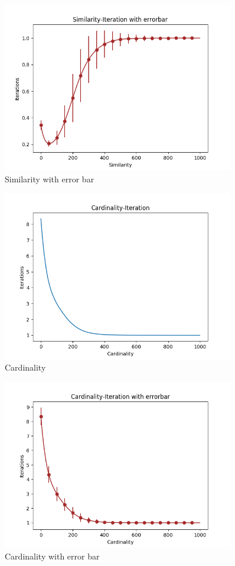 \documentclass[a4paper,12pt]{article}
\begin{document}
    \begin{figure}[H]
    	\centering
    	\includegraphics[width=0.9\textwidth]{SimErr50_4_1000_1500_e2}
    	\caption{Similarity with error bar}\label{SimErr50_4_1000_1500_e2}
    \end{figure}
    \begin{figure}[H]
    	\centering
    	\includegraphics[width=0.9\textwidth]{Card50_4_1000_1500_e2}
    	\caption{Cardinality}\label{Card50_4_1000_1500_e2}
    \end{figure}
    \begin{figure}[H]
    	\centering
    	\includegraphics[width=0.9\textwidth]{CardErr50_4_1000_1500_e2}
    	\caption{Cardinality with error bar}\label{CardErr50_4_1000_1500_e2}
    \end{figure}
\end{document}
